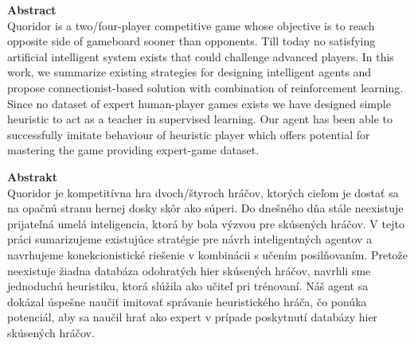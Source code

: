 \vspace*{0.5cm}
\noindent
{\textbf{Abstract}}
\normalsize \\
Quoridor is a two/four-player competitive game whose objective is to reach
opposite side of gameboard sooner than opponents. Till today no satisfying
artificial intelligent system exists that could challenge advanced players.
In this work, we summarize existing strategies for designing intelligent agents
and propose connectionist-based solution with combination of reinforcement
learning. Since no dataset of expert human-player games exists we have designed
simple heuristic to act as a teacher in supervised learning. Our agent has been
able to successfully imitate behaviour of heuristic player which offers
potential for mastering the game providing expert-game dataset.
\clearpage

\vspace*{0.5cm}
\noindent
{\textbf{Abstrakt}}
\normalsize \\
Quoridor je kompetitívna hra dvoch/štyroch hráčov, ktorých cieľom je dostať sa
na opačnú stranu hernej dosky skôr ako súperi. Do dnešného dňa stále neexistuje
prijateľná umelá inteligencia, ktorá by bola výzvou pre skúsených hráčov.
V tejto práci sumarizujeme existujúce stratégie pre návrh inteligentných
agentov a navrhujeme konekcionistické riešenie v kombinácii s učením
posilňovaním. Pretože neexistuje žiadna databáza odohratých hier skúsených
hráčov, navrhli sme jednoduchú heuristiku, ktorá slúžila ako učiteľ
pri trénovaní. Náš agent sa dokázal úspešne naučiť imitovať správanie
heuristického hráča, čo ponúka potenciál, aby sa naučil hrať ako expert
v prípade poskytnutí databázy hier skúsených hráčov.
\clearpage
